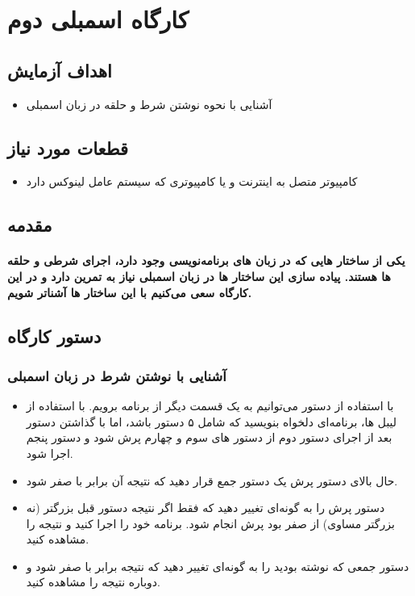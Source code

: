 \section{کارگاه اسمبلی دوم}

\subsection{اهداف آزمایش}
\begin{itemize}
    \item آشنایی با نحوه نوشتن شرط و حلقه در زبان اسمبلی
    
\end{itemize}

\subsection{قطعات مورد نیاز}
\begin{itemize}
    \item کامپیوتر متصل به اینترنت و یا کامپیوتری که سیستم عامل لینوکس دارد
\end{itemize}

\subsection{مقدمه}

\paragraph{
یکی از ساختار هایی که در زبان های برنامه‌نویسی وجود دارد، اجرای شرطی و حلقه ها هستند. پیاده سازی این ساختار ها در زبان اسمبلی نیاز به تمرین دارد و در این کارگاه سعی می‌کنیم با این ساختار ها آشناتر شویم.
}

\subsection{دستور کارگاه}

\subsubsection{آشنایی با نوشتن شرط در زبان اسمبلی}
\begin{itemize}
    \item با استفاده از دستور  می‌توانیم به یک قسمت دیگر از برنامه برویم. با استفاده از لیبل ها، برنامه‌ای دلخواه بنویسید که شامل ۵ دستور باشد، اما با گذاشتن دستور  بعد از اجرای دستور دوم از دستور های سوم و چهارم پرش شود و دستور پنجم اجرا شود.
    \item حال بالای دستور پرش یک دستور جمع قرار دهید که نتیجه آن برابر با صفر شود.
    \item دستور پرش را به گونه‌ای تغییر دهید که فقط اگر نتیجه دستور قبل بزرگتر (نه بزرگتر‌ مساوی) از صفر بود پرش انجام شود. برنامه خود را اجرا کنید و نتیجه را مشاهده کنید.
    \item دستور جمعی که نوشته بودید را به گونه‌ای تغییر دهید که نتیجه برابر با صفر شود و دوباره نتیجه را مشاهده کنید.
\end{itemize}

